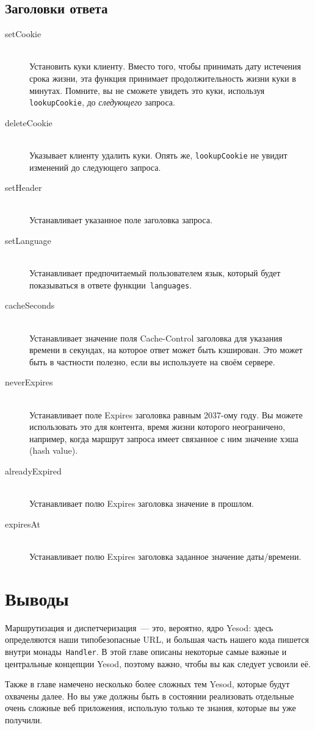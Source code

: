 \subsection{Заголовки ответа}
\begin{description}
\item[setCookie] \hfill \\
Установить куки клиенту. Вместо того, чтобы принимать дату истечения
срока жизни, эта функция принимает продолжительность жизни куки в
минутах. Помните, вы не сможете увидеть это куки, используя
\lstinline!lookupCookie!, до \emph{следующего} запроса.

\item[deleteCookie] \hfill \\
Указывает клиенту удалить куки. Опять же, \lstinline!lookupCookie! не
увидит изменений до следующего запроса.

\item[setHeader] \hfill \\
Устанавливает указанное поле заголовка запроса.

\item[setLanguage] \hfill \\
Устанавливает предпочитаемый пользователем язык, который будет
показываться в ответе функции~\lstinline!languages!.

\item[cacheSeconds] \hfill \\
Устанавливает значение поля Cache-Control заголовка для указания
времени в секундах, на которое ответ может быть кэширован. Это может
быть в частности полезно, если вы используете
 на своём сервере.

\item[neverExpires] \hfill \\
Устанавливает поле Expires заголовка равным 2037-ому году. Вы
можете использовать это для контента, время жизни которого
неограничено, например, когда маршрут запроса имеет связанное с ним
значение хэша (hash value).

\item[alreadyExpired] \hfill \\
Устанавливает полю Expires заголовка значение в прошлом.

\item[expiresAt] \hfill \\
Устанавливает полю Expires заголовка заданное значение даты/времени.
\end{description}

\section{Выводы}
Маршрутизация и диспетчеризация~--- это, вероятно, ядро Yesod: здесь
определяются наши типобезопасные URL, и большая часть нашего кода
пишется внутри монады~\lstinline!Handler!. В этой главе описаны
некоторые самые важные и центральные концепции Yesod, поэтому важно,
чтобы вы как следует усвоили её.

Также в главе намечено несколько более сложных тем Yesod, которые
будут охвачены далее. Но вы уже должны быть в состоянии реализовать
отдельные очень сложные веб приложения, использую только те знания,
которые вы уже получили.
